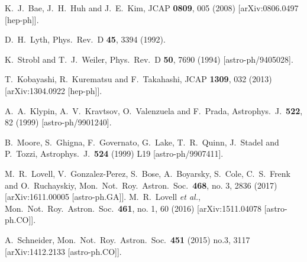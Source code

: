 \documentclass[11pt,nofootinbib]{article}
\numberwithin{equation}{section}
\begin{document}
\begin{thebibliography}{99}
  K.~J.~Bae, J.~H.~Huh and J.~E.~Kim,
  JCAP {\bf 0809}, 005 (2008)
  [arXiv:0806.0497 [hep-ph]].

  D.~H.~Lyth,
  Phys.\ Rev.\ D {\bf 45}, 3394 (1992).

  K.~Strobl and T.~J.~Weiler,
  Phys.\ Rev.\ D {\bf 50}, 7690 (1994)
  [astro-ph/9405028].

  T.~Kobayashi, R.~Kurematsu and F.~Takahashi,
  JCAP {\bf 1309}, 032 (2013)
  [arXiv:1304.0922 [hep-ph]].

  A.~A.~Klypin, A.~V.~Kravtsov, O.~Valenzuela and F.~Prada,
  Astrophys.\ J.\  {\bf 522}, 82 (1999)
  [astro-ph/9901240].

  B.~Moore, S.~Ghigna, F.~Governato, G.~Lake, T.~R.~Quinn, J.~Stadel and P.~Tozzi,
  Astrophys.\ J.\  {\bf 524} (1999) L19
  [astro-ph/9907411].

  M.~R.~Lovell, V.~Gonzalez-Perez, S.~Bose, A.~Boyarsky, S.~Cole, C.~S.~Frenk and O.~Ruchayskiy,
  Mon.\ Not.\ Roy.\ Astron.\ Soc.\  {\bf 468}, no. 3, 2836 (2017)
  [arXiv:1611.00005 [astro-ph.GA]].
  M.~R.~Lovell {\it et al.},
  Mon.\ Not.\ Roy.\ Astron.\ Soc.\  {\bf 461}, no. 1, 60 (2016)
  [arXiv:1511.04078 [astro-ph.CO]].
	
  A.~Schneider,
  Mon.\ Not.\ Roy.\ Astron.\ Soc.\  {\bf 451} (2015) no.3,  3117
  [arXiv:1412.2133 [astro-ph.CO]].
  

\end{thebibliography}
\end{document}
